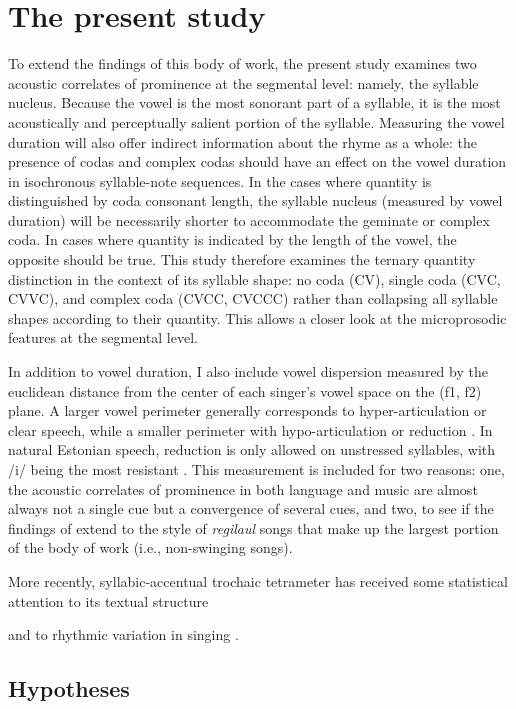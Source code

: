 \section{The present study}

To extend the findings of this body of work, the present study examines two acoustic correlates of prominence at the segmental level: namely, the syllable nucleus. Because the vowel is the most sonorant part of a syllable, it is the most acoustically and perceptually salient portion of the syllable. Measuring the vowel duration will also offer indirect information about the rhyme as a whole: the presence of codas and complex codas should have an effect on the vowel duration in isochronous syllable-note sequences. In the cases where quantity is distinguished by coda consonant length, the syllable nucleus (measured by vowel duration) will be necessarily shorter to accommodate the geminate or complex coda. In cases where quantity is indicated by the length of the vowel, the opposite should be true. This study therefore examines the ternary quantity distinction in the context of its syllable shape: no coda (CV), single coda (CVC, CVVC), and complex coda (CVCC, CVCCC) rather than collapsing all syllable shapes according to their quantity. This allows a closer look at the microprosodic features at the segmental level. 

In addition to vowel duration, I also include vowel dispersion measured by the euclidean distance from the center of each singer's vowel space on the (f1, f2) plane. A larger vowel perimeter generally corresponds to hyper-articulation or clear speech, while a smaller perimeter with hypo-articulation or reduction \cite{lindblom1990, smiljanic2005}. In natural Estonian speech, reduction is only allowed on unstressed syllables, with /i/ being the most resistant \citep{eekMeister1998}. This measurement is included for two reasons: one, the acoustic correlates of prominence in both language and music are almost always not a single cue but a convergence of several cues, and two, to see if the findings of \citep{ross1992} extend to the style of {\it regilaul} songs that make up the largest portion of the body of work (i.e., non-swinging songs). 


More recently, syllabic-accentual trochaic tetrameter has received some statistical attention to its textual structure \citep{lotmanLotman2013} 

and to rhythmic variation in singing \citep{oras2019}. 
\subsection{Hypotheses}
%




